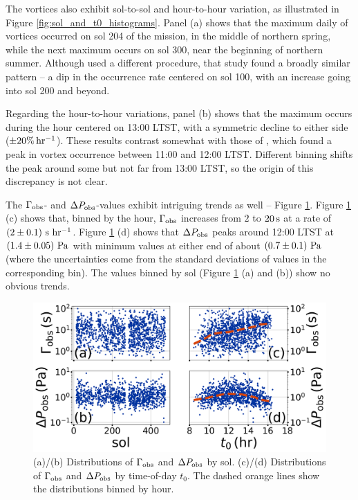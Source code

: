 \documentclass{aastex63}
\begin{document}
The vortices also exhibit sol-to-sol and hour-to-hour variation, as illustrated in Figure \ref{fig:sol_and_t0_histograms}. Panel (a) shows that the maximum daily of vortices occurred on sol 204 of the mission, in the middle of northern spring, while the next maximum occurs on sol 300, near the beginning of northern summer. Although \citet{2020arXiv200501134S} used a different procedure, that study found a broadly similar pattern -- a dip in the occurrence rate centered on sol 100, with an increase going into sol 200 and beyond. 

Regarding the hour-to-hour variations, panel (b) shows that the maximum occurs during the hour centered on 13:00 LTST, with a symmetric decline to either side ($\pm20\%\,{\rm hr^{-1}}$). These results contrast somewhat with those of \citet{2020arXiv200501134S}, which found a peak in vortex occurrence between 11:00 and 12:00 LTST. Different binning shifts the peak around some but not far from 13:00 LTST, so the origin of this discrepancy is not clear. 

The $\Gamma_{\rm obs}$- and $\Delta P_{\rm obs}$-values exhibit intriguing trends as well -- Figure \ref{fig:Gammaobs_DeltaPobs_vs_TOD_and_sol}. Figure \ref{fig:Gammaobs_DeltaPobs_vs_TOD_and_sol} (c) shows that, binned by the hour, $\Gamma_{\rm obs}$ increases from $2$ to $20\,{\rm s}$ at a rate of $\left( 2\pm0.1 \right)\,{\rm s\ hr^{-1}}$. Figure \ref{fig:Gammaobs_DeltaPobs_vs_TOD_and_sol} (d) shows that $\Delta P_{\rm obs}$ peaks around 12:00 LTST at $\left( 1.4\pm0.05 \right)\,{\rm Pa}$ with minimum values at either end of about $\left( 0.7\pm 0.1 \right)\,{\rm Pa}$ (where the uncertainties come from the standard deviations of values in the corresponding bin). The values binned by sol (Figure \ref{fig:Gammaobs_DeltaPobs_vs_TOD_and_sol} (a) and (b)) show no obvious trends. 

\begin{figure}
    \centering
    \includegraphics[width=\textwidth]{figures/Gammaobs_DeltaPobs_vs_TOD_and_sol.png}
    \caption{(a)/(b) Distributions of $\Gamma_{\rm obs}$ and $\Delta P_{\rm obs}$ by sol. (c)/(d) Distributions of $\Gamma_{\rm obs}$ and $\Delta P_{\rm obs}$ by time-of-day $t_0$. The dashed orange lines show the distributions binned by hour.}
    \label{fig:Gammaobs_DeltaPobs_vs_TOD_and_sol}
\end{figure}
\end{document}
